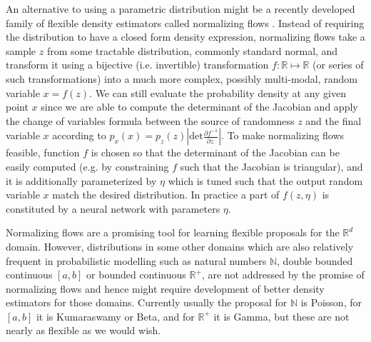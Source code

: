 \documentclass[12pt]{article}
\begin{document}
An alternative to using a parametric distribution might be a recently developed family of flexible density estimators called normalizing flows \citep{RezendeMohamed2015,IAF,MAF}.
Instead of requiring the distribution to have a closed form density expression, normalizing flows take a sample $z$ from some tractable distribution, commonly standard normal, and transform it using a bijective (i.e. invertible) transformation $f: \mathbb{R} \mapsto \mathbb{R}$ (or series of such transformations) into a much more complex, possibly multi-modal, random variable $x=f(z)$.
We can still evaluate the probability density at any given point $x$ since we are able to compute the determinant of the Jacobian and apply the change of variables formula between the source of randomness $z$ and the final variable $x$ according to 
$p_x(x) = p_z(z) \left|
    \mathrm{det} \frac{
      \partial f^{-1}
    }{
      \partial z\
    }
  \right|$.
To make normalizing flows feasible, function $f$ is chosen so that the determinant of the Jacobian can be easily computed (e.g. by constraining $f$ such that the Jacobian is triangular), and it is additionally parameterized by $\eta$ which is tuned such that the output random variable $x$ match the desired distribution. In practice a part of $f(z, \eta)$ is constituted by a neural network with parameters $\eta$.



Normalizing flows are a promising tool for learning flexible proposals for the $\mathbb{R}^d$ domain.
However, distributions in some other domains which are also relatively frequent in probabilistic modelling such as natural numbers $\mathbb{N}$, double bounded continuous $[a,b]$ or bounded continuous $\mathbb{R}^+$, are not addressed by the promise of normalizing flows and hence might require development of better density estimators for those domains.
Currently usually the proposal for $\mathbb{N}$ is Poisson, for $[a,b]$ it is Kumaraswamy or Beta, and for $\mathbb{R}^+$ it is Gamma, 
but these are not nearly as flexible as we would wish.
\end{document}
